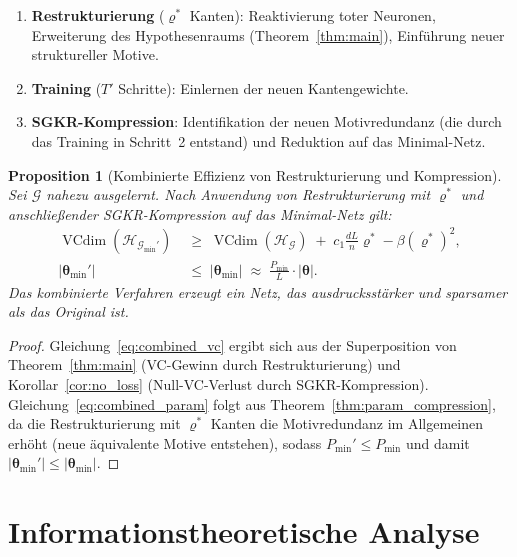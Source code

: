 ﻿\documentclass[12pt, a4paper, openany]{report}
\newtheorem{proposition}[theorem]{Proposition}
\newcommand{\calG}{\mathcal{G}}
\newcommand{\calH}{\mathcal{H}}
\DeclareMathOperator{\VC}{VCdim}
\begin{document}
\begin{enumerate}[label=(\arabic*)]
  \item \textbf{Restrukturierung} ($\varrho^*$ Kanten): Reaktivierung toter
    Neuronen, Erweiterung des Hypothesenraums (Theorem~\ref{thm:main}),
    Einführung neuer struktureller Motive.
  \item \textbf{Training} ($T'$ Schritte): Einlernen der neuen Kantengewichte.
  \item \textbf{SGKR-Kompression}: Identifikation der neuen Motivredundanz
    (die durch das Training in Schritt~2 entstand) und Reduktion auf das
    Minimal-Netz.
\end{enumerate}

\begin{proposition}[Kombinierte Effizienz von Restrukturierung und Kompression]
\label{prop:combined_efficiency}
Sei $\calG$ nahezu ausgelernt.  Nach Anwendung von Restrukturierung mit
$\varrho^*$ und anschließender SGKR-Kompression auf das Minimal-Netz gilt:
\begin{align}
  \label{eq:combined_vc}
  \VC(\calH_{\calG_{\min}'}) &\;\geq\; \VC(\calH_{\calG})
    \;+\; c_1\frac{dL}{n}\varrho^* - \beta(\varrho^*)^2, \\
  \label{eq:combined_param}
  |\bm{\theta}_{\min}'| &\;\leq\; |\bm{\theta}_{\min}|
    \;\approx\; \frac{P_{\min}}{L} \cdot |\bm{\theta}|.
\end{align}
Das kombinierte Verfahren erzeugt ein Netz, das
\emph{ausdrucksstärker} \emph{und sparsamer} als das Original ist.
\end{proposition}

\begin{proof}
Gleichung~\eqref{eq:combined_vc} ergibt sich aus der Superposition von
Theorem~\ref{thm:main} (VC-Gewinn durch Restrukturierung) und
Korollar~\ref{cor:no_loss} (Null-VC-Verlust durch SGKR-Kompression).
Gleichung~\eqref{eq:combined_param} folgt aus Theorem~\ref{thm:param_compression},
da die Restrukturierung mit $\varrho^*$ Kanten die Motivredundanz im
Allgemeinen erhöht (neue äquivalente Motive entstehen), sodass
$P_{\min}' \leq P_{\min}$ und damit $|\bm{\theta}_{\min}'| \leq |\bm{\theta}_{\min}|$.
\end{proof}

\chapter{Informationstheoretische Analyse}
\label{sec:information}
\end{document}
